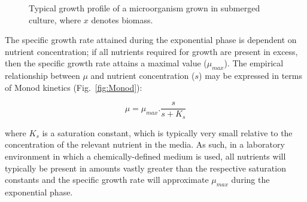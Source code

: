 \begin{figure}[t]
	\centering
  \caption{Typical growth profile of a microorganism grown in submerged culture, where $x$ denotes biomass.}
  \label{fig:GrowthPhases}
\end{figure}

The specific growth rate attained during the exponential phase is dependent on nutrient concentration; if all nutrients required for growth are present in excess, then the specific growth rate attains a maximal value ($\mu_{max}$). The empirical relationship between $\mu$ and nutrient concentration ($s$) may be expressed in terms of Monod kinetics (Fig.~\ref{fig:Monod}):

\begin{equation}
	 \mu = \mu_{max} . \frac{s}{s + K_s} 
\end{equation}

\noindent where $K_s$ is a saturation constant, which is typically very small relative to the concentration of the relevant nutrient in the media. As such, in a laboratory environment in which a chemically-defined medium is used, all nutrients will typically be present in amounts vastly greater than the respective saturation constants and the specific growth rate will approximate $\mu_{max}$ during the exponential phase.


